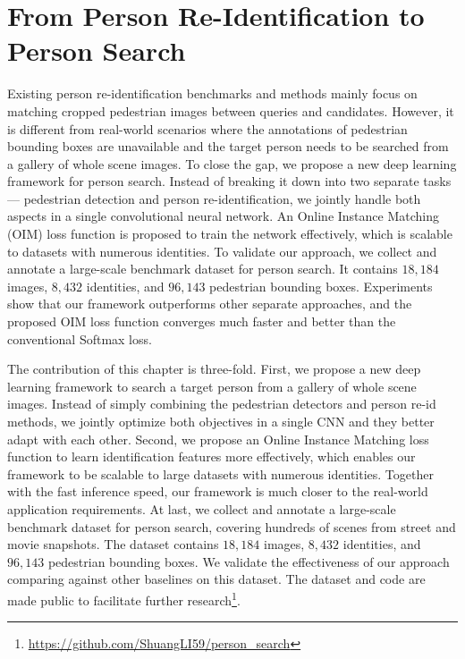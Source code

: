 \chapter{From Person Re-Identification to Person Search}
\label{ch:person-search}

Existing person re-identification benchmarks and methods mainly focus on matching cropped pedestrian images between queries and candidates. However, it is different from real-world scenarios where the annotations of pedestrian bounding boxes are unavailable and the target person needs to be searched from a gallery of whole scene images. To close the gap, we propose a new deep learning framework for person search. Instead of breaking it down into two separate tasks --- pedestrian detection and person re-identification, we jointly handle both aspects in a single convolutional neural network. An Online Instance Matching (OIM) loss function is proposed to train the network effectively, which is scalable to datasets with numerous identities. To validate our approach, we collect and annotate a large-scale benchmark dataset for person search. It contains $18,184$ images, $8,432$ identities, and $96,143$ pedestrian bounding boxes. Experiments show that our framework outperforms other separate approaches, and the proposed OIM loss function converges much faster and better than the conventional Softmax loss.

The contribution of this chapter is three-fold. First, we propose a new deep learning framework to search a target person from a gallery of whole scene images. Instead of simply combining the pedestrian detectors and person re-id methods, we jointly optimize both objectives in a single CNN and they better adapt with each other. Second, we propose an Online Instance Matching loss function to learn identification features more effectively, which enables our framework to be scalable to large datasets with numerous identities. Together with the fast inference speed, our framework is much closer to the real-world application requirements. At last, we collect and annotate a large-scale benchmark dataset for person search, covering hundreds of scenes from street and movie snapshots. The dataset contains $18,184$ images, $8,432$ identities, and $96,143$ pedestrian bounding boxes. We validate the effectiveness of our approach comparing against other baselines on this dataset. The dataset and code are made public to facilitate further research\footnote{\url{https://github.com/ShuangLI59/person_search}}.


